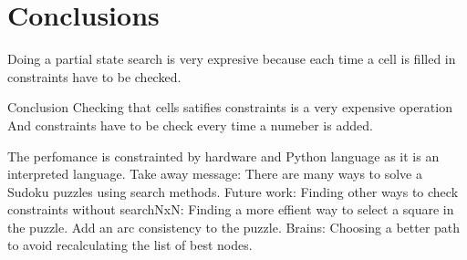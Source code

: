 \documentclass[letterpaper]{article}
\begin{document}
\section{Conclusions}
Doing a partial state search is very expresive because each time a cell is filled in constraints have to be checked.

Conclusion
	Checking that cells satifies constraints is a very expensive operation And constraints have to be check every time a numeber is added.
	
	The perfomance is constrainted by hardware and Python language as it is an interpreted language.
	Take away message:
		There are many ways to solve a Sudoku puzzles using search methods. 
	Future work:
		Finding other ways to check constraints without 
		searchNxN:
			Finding a more effient way to select a square in the puzzle.
			Add an arc consistency to the puzzle.
		Brains:
			Choosing a better path to avoid recalculating the list of best nodes.
\end{document}
